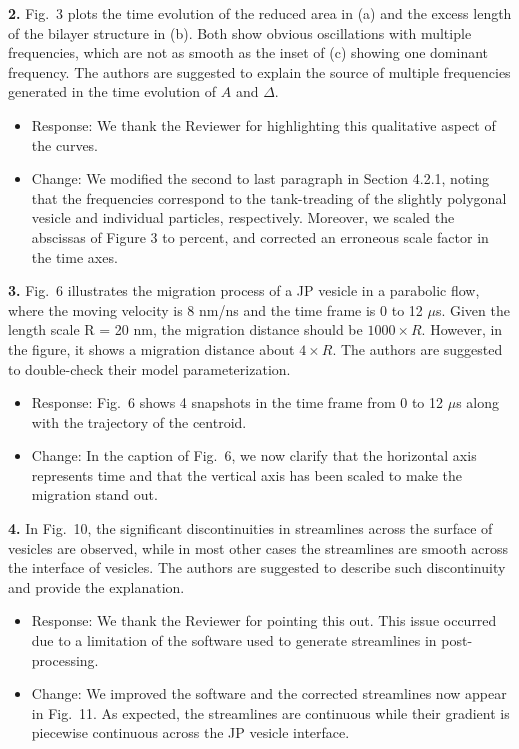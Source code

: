 \documentclass[11pt]{article}
\newcommand{\comment}[1]{{\color{blue} #1}}
\begin{document}
\noindent
\comment{{\bf 2.} Fig.~3 plots the time evolution of the reduced area in (a) and
the excess length of the bilayer structure in (b). Both show obvious
oscillations with multiple frequencies, which are not as smooth as the
inset of (c) showing one dominant frequency. The authors are suggested
to explain the source of multiple frequencies generated in the time
evolution of $A$ and $\Delta$.}
\begin{itemize}
\item Response: We thank the Reviewer for highlighting this qualitative aspect of
  the curves.

\item Change: We modified the second to last paragraph in Section 4.2.1,
 noting that the frequencies correspond to the tank-treading of the slightly
  polygonal vesicle and individual particles, respectively. 
  Moreover, we scaled the abscissas of Figure 3 to percent, and corrected
  an erroneous scale factor in the time axes. 
\end{itemize}

\noindent
\comment{{\bf 3.} Fig.~6 illustrates the migration process of a JP vesicle in a
parabolic flow, where the moving velocity is 8 nm/ns and the time frame
is 0 to 12 $\mu$s. Given the length scale R = 20 nm, the migration
distance should be $1000 \times R$. However, in the figure, it shows a
migration distance about $4 \times R$. The authors are suggested to
double-check their model parameterization.}
\begin{itemize}
\item Response: Fig.~6 shows 4 snapshots in the time frame from 0 to 12
  $\mu$s along with the trajectory of the centroid.

  \item Change: In the caption of Fig.~6, we now clarify that the
    horizontal axis represents time and that the vertical axis has been
    scaled to make the migration stand out.
  
\end{itemize}

\noindent
\comment{{\bf 4.} In Fig.~10, the significant discontinuities in streamlines
across the surface of vesicles are observed, while in most other cases
the streamlines are smooth across the interface of vesicles. The authors
are suggested to describe such discontinuity and provide the
explanation.}
\begin{itemize}
\item Response: We thank the Reviewer for pointing this out.
  This issue occurred due to a limitation of the software used
  to generate streamlines in post-processing.

\item Change: We improved the software and the corrected streamlines now appear in Fig.~11.
  As expected, the streamlines are continuous while their gradient is
    piecewise continuous
  across the JP vesicle interface.
\end{itemize}
\end{document}
